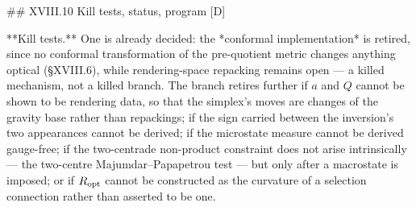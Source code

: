 ## XVIII.10 Kill tests, status, program [D]

**Kill tests.** One is already decided: the *conformal implementation* is retired, since no conformal transformation of the pre-quotient metric changes anything optical (§XVIII.6), while rendering-space repacking remains open — a killed mechanism, not a killed branch. The branch retires further if $a$ and $Q$ cannot be shown to be rendering data, so that the simplex's moves are changes of the gravity base rather than repackings; if the sign carried between the inversion's two appearances cannot be derived; if the microstate measure cannot be derived gauge-free; if the two-centrade non-product constraint does not arise intrinsically — the two-centre Majumdar–Papapetrou test — but only after a macrostate is imposed; or if $R_{\rm opt}$ cannot be constructed as the curvature of a selection connection rather than asserted to be one.

